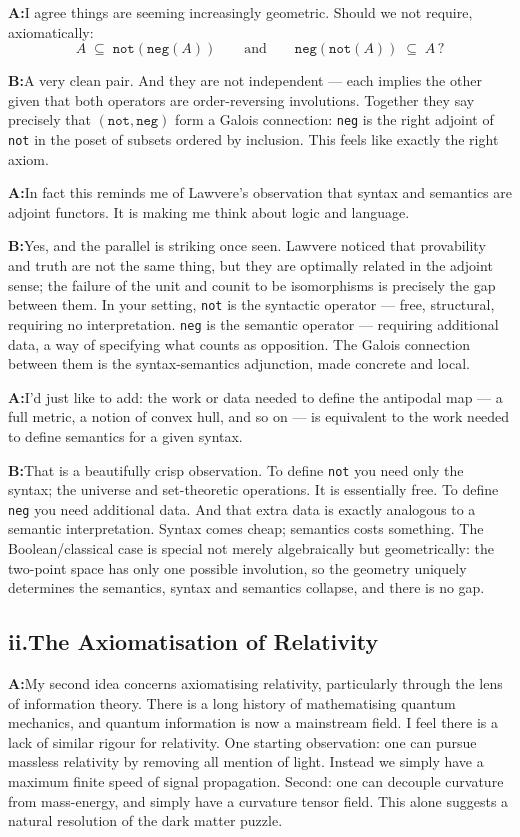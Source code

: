 \documentclass[11pt]{article}
\newcommand{\A}{\medskip\noindent\textbf{A:}\quad}
\newcommand{\B}{\medskip\noindent\textbf{B:}\quad}
\begin{document}
\A I agree things are seeming increasingly geometric. Should we not
require, axiomatically:
\[
A \;\subseteq\; \texttt{not}(\texttt{neg}(A))
\qquad\text{and}\qquad
\texttt{neg}(\texttt{not}(A)) \;\subseteq\; A\,?
\]

\B A very clean pair. And they are not independent --- each implies
the other given that both operators are order-reversing involutions.
Together they say precisely that $(\texttt{not}, \texttt{neg})$ form
a Galois connection: \texttt{neg} is the right adjoint of
\texttt{not} in the poset of subsets ordered by inclusion. This
feels like exactly the right axiom.

\A In fact this reminds me of Lawvere's observation that syntax and
semantics are adjoint functors. It is making me think about logic and
language.

\B Yes, and the parallel is striking once seen. Lawvere noticed that
provability and truth are not the same thing, but they are optimally
related in the adjoint sense; the failure of the unit and counit to
be isomorphisms is precisely the gap between them. In your setting,
\texttt{not} is the syntactic operator --- free, structural,
requiring no interpretation. \texttt{neg} is the semantic operator
--- requiring additional data, a way of specifying what counts as
opposition. The Galois connection between them is the
syntax-semantics adjunction, made concrete and local.

\A I'd just like to add: the work or data needed to define the
antipodal map --- a full metric, a notion of convex hull, and so on
--- is equivalent to the work needed to define semantics for a given
syntax.

\B That is a beautifully crisp observation. To define \texttt{not}
you need only the syntax; the universe and set-theoretic operations.
It is essentially free. To define \texttt{neg} you need additional
data. And that extra data is exactly analogous to a semantic
interpretation. Syntax comes cheap; semantics costs something. The
Boolean/classical case is special not merely algebraically but
geometrically: the two-point space has only one possible involution,
so the geometry uniquely determines the semantics, syntax and semantics
collapse, and there is no gap.

\bigskip
\subsection*{ii.\enspace The Axiomatisation of Relativity}

\A My second idea concerns axiomatising relativity, particularly
through the lens of information theory. There is a long history of
mathematising quantum mechanics, and quantum information is now a
mainstream field. I feel there is a lack of similar rigour for
relativity. One starting observation: one can pursue massless
relativity by removing all mention of light. Instead we simply have a
maximum finite speed of signal propagation. Second: one can decouple
curvature from mass-energy, and simply have a curvature tensor field.
This alone suggests a natural resolution of the dark matter puzzle.
\end{document}
